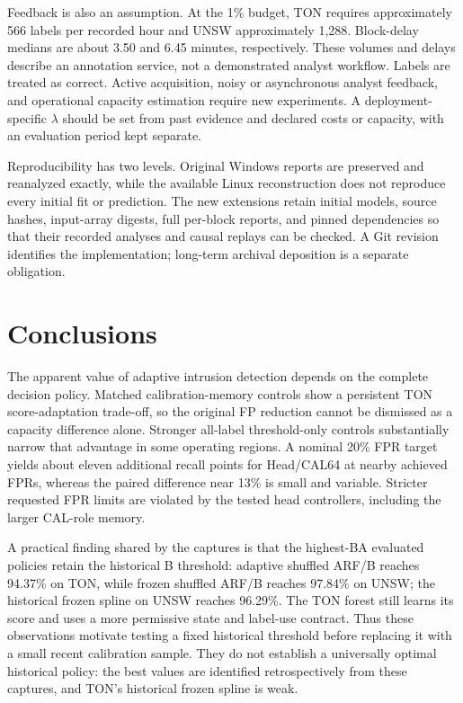 Feedback is also an assumption. At the 1\% budget, TON requires approximately 566 labels per recorded hour and UNSW approximately 1,288. Block-delay medians are about 3.50 and 6.45 minutes, respectively. These volumes and delays describe an annotation service, not a demonstrated analyst workflow. Labels are treated as correct. Active acquisition, noisy or asynchronous analyst feedback, and operational capacity estimation require new experiments. A deployment-specific $\lambda$ should be set from past evidence and declared costs or capacity, with an evaluation period kept separate.

Reproducibility has two levels. Original Windows reports are preserved and reanalyzed exactly, while the available Linux reconstruction does not reproduce every initial fit or prediction. The new extensions retain initial models, source hashes, input-array digests, full per-block reports, and pinned dependencies so that their recorded analyses and causal replays can be checked. A Git revision identifies the implementation; long-term archival deposition is a separate obligation.

\section{Conclusions}
The apparent value of adaptive intrusion detection depends on the complete decision policy. Matched calibration-memory controls show a persistent TON score-adaptation trade-off, so the original FP reduction cannot be dismissed as a capacity difference alone. Stronger all-label threshold-only controls substantially narrow that advantage in some operating regions. A nominal 20\% FPR target yields about eleven additional recall points for Head/CAL64 at nearby achieved FPRs, whereas the paired difference near 13\% is small and variable. Stricter requested FPR limits are violated by the tested head controllers, including the larger CAL-role memory.

A practical finding shared by the captures is that the highest-BA evaluated policies retain the historical B threshold: adaptive shuffled ARF/B reaches 94.37\% on TON, while frozen shuffled ARF/B reaches 97.84\% on UNSW; the historical frozen spline on UNSW reaches 96.29\%. The TON forest still learns its score and uses a more permissive state and label-use contract. Thus these observations motivate testing a fixed historical threshold before replacing it with a small recent calibration sample. They do not establish a universally optimal historical policy: the best values are identified retrospectively from these captures, and TON's historical frozen spline is weak.

